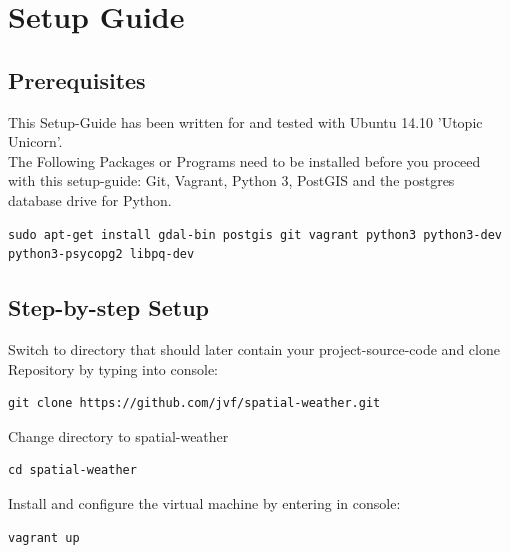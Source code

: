 \documentclass[paper=a4, fontsize=11pt]{article} %
\numberwithin{equation}{section} %
\numberwithin{figure}{section} %
\numberwithin{table}{section} %
\begin{document}
\section{Setup Guide}
\subsection{Prerequisites}

This Setup-Guide has been written for and tested with Ubuntu 14.10 'Utopic Unicorn'.\\
The Following Packages or Programs need to be installed before you proceed with this setup-guide: Git, Vagrant, Python 3, PostGIS and the postgres database drive for Python.

\begin{lstlisting}
sudo apt-get install gdal-bin postgis git vagrant python3 python3-dev python3-psycopg2 libpq-dev
\end{lstlisting}

%
%
\subsection{Step-by-step Setup}
Switch to directory that should later contain your project-source-code and clone Repository by typing into console:
\begin{lstlisting}
git clone https://github.com/jvf/spatial-weather.git
\end{lstlisting}

Change directory to spatial-weather
\begin{lstlisting}
cd spatial-weather
\end{lstlisting}

Install and configure the virtual machine by entering in console:
\begin{lstlisting}
vagrant up
\end{lstlisting}
\end{document}
